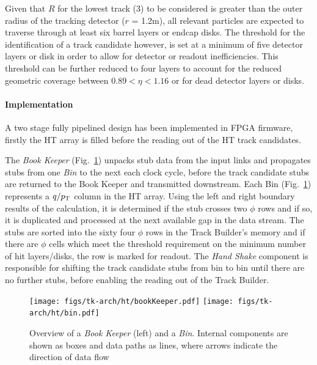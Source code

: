 Given that $R$ for the lowest \pT track (3\GeV) to be considered is greater than the outer radius of the tracking detector ($r$ = 1.2m), all relevant particles are expected to traverse through at least six barrel layers or endcap disks. 
The threshold for the identification of a track candidate however, is set at a minimum of five detector layers or disk in order to allow for detector or readout inefficiencies. 
This threshold can be further reduced to four layers to account for the reduced geometric coverage between $0.89 < \eta < 1.16$ or for dead detector layers or disks.

\paragraph{Implementation}
A two stage fully pipelined design has been implemented in FPGA firmware, firstly the HT array is filled before the reading out of the HT track candidates. 

The \textit{Book Keeper} (Fig.~\ref{fig:implementationHT}) unpacks stub data from the input links and propagates stubs from one \textit{Bin} to the next each clock cycle, before the track candidate stubs are returned to the Book Keeper and transmitted downstream. 
Each Bin (Fig.~\ref{fig:implementationHT}) represents a $q/p_{\mathrm{T}}$ column in the HT array. 
Using the left and right boundary results of the \HT calculation, it is determined if the stub crosses two $\phi$ rows and if so, it is duplicated and processed at the next available gap in the data stream. 
The stubs are sorted into the sixty four $\phi$ rows in the Track Builder's memory and if there are $\phi$ cells which meet the threshold requirement on the minimum number of hit layers/disks, the row is marked for readout. 
The \textit{Hand Shake} component is responsible for shifting the track candidate stubs from bin to bin until there are no further stubs, before enabling the reading out of the Track Builder.

\begin{figure}[!t]
\centering
\texttt{[image: figs/tk-arch/ht/bookKeeper.pdf]}
\texttt{[image: figs/tk-arch/ht/bin.pdf]}
\caption{Overview of a \textit{Book Keeper} (left) and a \textit{Bin}. Internal components are shown as boxes and data paths as lines, where arrows indicate the direction of data flow}
\label{fig:implementationHT}
\end{figure}

